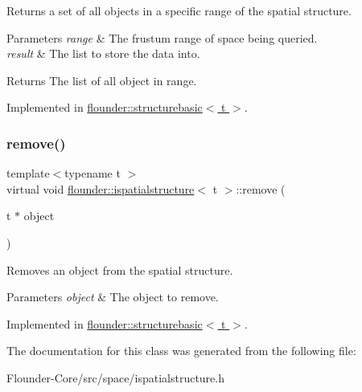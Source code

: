 Returns a set of all objects in a specific range of the spatial structure. 


\begin{DoxyParams}{Parameters}
{\em range} & The frustum range of space being queried. \\
\hline
{\em result} & The list to store the data into. \\
\hline
\end{DoxyParams}
\begin{DoxyReturn}{Returns}
The list of all object in range. 
\end{DoxyReturn}


Implemented in \hyperlink{classflounder_1_1structurebasic_ae53d9ef72c5dfb9bfee6012e51c32d95}{flounder\+::structurebasic$<$ t $>$}.

\mbox{\label{classflounder_1_1ispatialstructure_a28ec931fce23b42227a8deac1c576ed3}} 
\subsubsection{\texorpdfstring{remove()}{remove()}}
{\footnotesize\ttfamily template$<$typename t $>$ \\
virtual void \hyperlink{classflounder_1_1ispatialstructure}{flounder\+::ispatialstructure}$<$ t $>$\+::remove (\begin{DoxyParamCaption}\item[{t $\ast$}]{object }\end{DoxyParamCaption})\hspace{0.3cm}{\ttfamily [pure virtual]}}



Removes an object from the spatial structure. 


\begin{DoxyParams}{Parameters}
{\em object} & The object to remove. \\
\hline
\end{DoxyParams}


Implemented in \hyperlink{classflounder_1_1structurebasic_aad7fb3ea380f8af0bef40f86437db4cb}{flounder\+::structurebasic$<$ t $>$}.



The documentation for this class was generated from the following file\+:\begin{DoxyCompactItemize}
\item 
Flounder-\/\+Core/src/space/ispatialstructure.\+h\end{DoxyCompactItemize}
